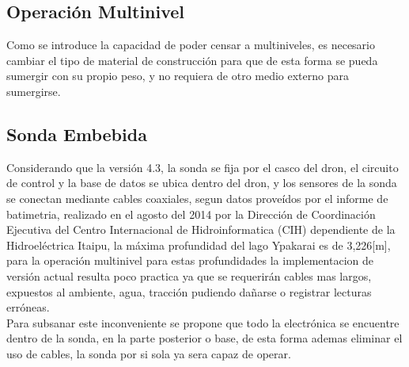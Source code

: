 \begin{appendices}
    
    
    
    
    
    
    
    
    
    

\subsection*{Operación Multinivel}
Como se introduce la capacidad de poder censar a multiniveles, es necesario cambiar el tipo de material de construcción para que de esta forma se pueda sumergir con su propio peso, y no requiera de otro medio externo para sumergirse. 
\subsection*{Sonda Embebida}
Considerando que la versión 4.3, la sonda se fija por el casco del dron, el circuito de control y la base de datos se ubica dentro del dron, y los sensores de la sonda se conectan mediante cables coaxiales, segun datos proveídos por el informe de batimetria, realizado en el agosto del 2014  por la Dirección de Coordinación Ejecutiva del Centro Internacional de Hidroinformatica (CIH) dependiente de la Hidroeléctrica Itaipu, la máxima profundidad del lago Ypakarai es de 3,226[m], para la operación multinivel para estas profundidades la implementacion de versión actual resulta poco practica ya que se requerirán cables mas largos, expuestos al ambiente, agua, tracción pudiendo dañarse o registrar lecturas erróneas.\\ Para subsanar este inconveniente se propone que todo la electrónica se encuentre dentro de la sonda, en la parte posterior o base, de esta forma ademas eliminar el uso de cables, la sonda por si sola ya sera capaz de operar.


\end{appendices}

